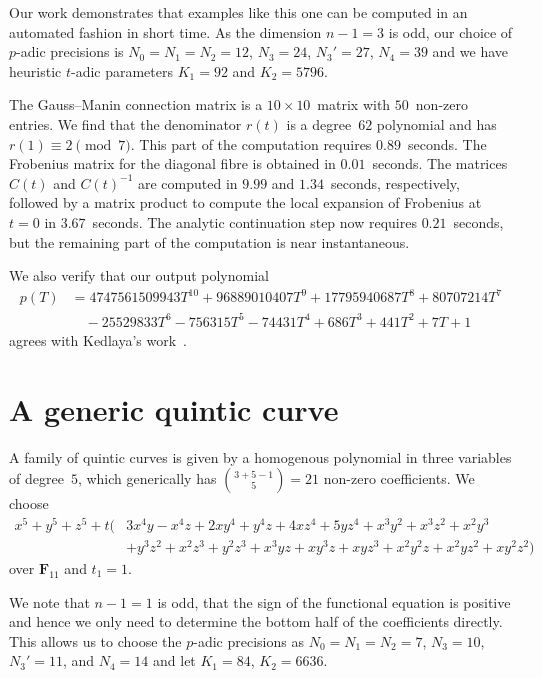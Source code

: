 Our work demonstrates that examples like this one can be computed in an 
automated fashion in short time.  As the dimension $n-1 = 3$ is odd, our 
choice of $p$-adic precisions is $N_0 = N_1 = N_2 = 12$, $N_3 = 24$, 
$N_3' = 27$, $N_4 = 39$ and we have heuristic $t$-adic parameters $K_1 = 92$ 
and $K_2 = 5796$.

The Gauss--Manin connection matrix is a $10 \times 10$~matrix with 
$50$~non-zero entries.  We find that the denominator $r(t)$ is a degree~$62$ 
polynomial and has $r(1) \equiv 2 \pmod{7}$.  This part of the computation 
requires $0.89$~seconds.  The Frobenius matrix for the diagonal fibre is 
obtained in $0.01$~seconds.  The matrices $C(t)$ and $C(t)^{-1}$ are 
computed in $9.99$ and $1.34$~seconds, respectively, followed by a matrix 
product to compute the local expansion of Frobenius at $t = 0$ in 
$3.67$~seconds.  The analytic continuation step now requires $0.21$~seconds, 
but the remaining part of the computation is near instantaneous.

We also verify that our output polynomial 
\begin{align*}
p(T) & = 4747561509943 T^{10}+96889010407 T^9+17795940687 T^8 +80707214 T^7 \\
& \quad -25529833 T^6 
-756315 T^5-74431 T^4+686 T^3+441 T^2+7 T+1
\end{align*}
agrees with Kedlaya's work~\citep[p.~20]{Kedlaya2011}.

\section{A generic quintic curve}

A family of quintic curves is given by a homogenous polynomial 
in three variables of degree~$5$, which generically has 
$\binom{3+5-1}{5} = 21$ non-zero coefficients.  We choose 
\begin{equation*}
\begin{split}
x^5 + y^5 + z^5 + t \bigl( 
& 3 x^4 y - x^4 z + 2 x y^4 + y^4 z + 4 x z^4 + 5 y z^4 + x^3 y^2 + x^3 z^2 + x^2 y^3 \\
& + y^3 z^2 + x^2 z^3 + y^2 z^3 + x^3 y z + x y^3 z + x y z^3 + x^2 y^2 z + x^2 y z^2 + x y^2 z^2 \bigr)
\end{split}
\end{equation*}
over $\mathbf{F}_{11}$ and $t_1 = 1$.

We note that $n-1 = 1$ is odd, that the sign of the functional 
equation is positive and hence we only need to determine the 
bottom half of the coefficients directly.  This allows us to 
choose the $p$-adic precisions as $N_0 = N_1 = N_2 = 7$, 
$N_3 = 10$, $N_3' = 11$, and $N_4 = 14$ and let $K_1 = 84$, $K_2 = 6636$.

